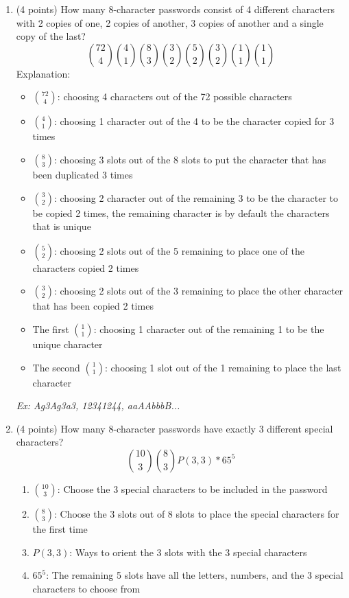 \documentclass[10pt,letterpaper,unboxed,cm]{article}
\begin{document}
\begin{enumerate}
\begin{enumerate}
\item
(4 points)
How many 8-character passwords consist of 4 different characters with 2 copies of one, 2 copies of another, 3 copies of another and a single copy of the last?
$$
    \binom{72}{4}\binom{4}{1}\binom{8}{3}\binom{3}{2}\binom{5}{2}\binom{3}{2}\binom{1}{1}\binom{1}{1}
$$
Explanation:
\begin{itemize}
    \item $\binom{72}{4}$: choosing 4 characters out of the 72 possible characters
    \item $\binom{4}{1}$: choosing 1 character out of the 4 to be the character copied for 3 times
    \item $\binom{8}{3}$: choosing 3 slots out of the 8 slots to put the character that has been duplicated 3 times
    \item $\binom{3}{2}$: choosing 2 character out of the remaining 3 to be the character to be copied 2 times, the remaining character is by default the characters that is unique
    \item $\binom{5}{2}$: choosing 2 slots out of the 5 remaining to place one of the characters copied 2 times
    \item $\binom{3}{2}$: choosing 2 slots out of the 3 remaining to place the other character that has been copied 2 times
    \item The first $\binom{1}{1}$: choosing 1 character out of the remaining 1 to be the unique character
    \item The second $\binom{1}{1}$: choosing 1 slot out of the 1 remaining to place the last character
\end{itemize}


\emph{Ex: Ag3Ag3a3, 12341244, aaAAbbbB...}

\item
(4 points)
How many 8-character passwords have exactly 3 different special characters?
$$
    \binom{10}{3}\binom{8}{3}P(3, 3)*65^5
$$
\begin{enumerate}
    \item $\binom{10}{3}$: Choose the 3 special characters to be included in the password
    \item $\binom{8}{3}$: Choose the 3 slots out of 8 slots to place the special characters for the first time
    \item $P(3, 3)$: Ways to orient the 3 slots with the 3 special characters
    \item $65^5$: The remaining 5 slots have all the letters, numbers, and the 3 special characters to choose from
\end{enumerate}


\end{enumerate}
\end{enumerate}
\end{document}
